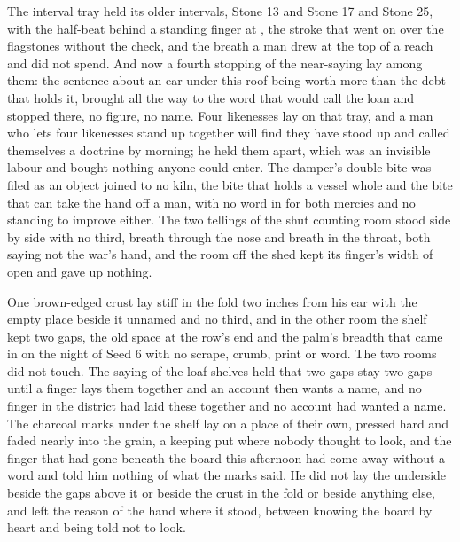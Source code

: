 The interval tray held its older intervals, Stone 13 and Stone 17 and Stone 25, with the half-beat behind a standing finger at , the stroke that went on over the flagstones without the check, and the breath a man drew at the top of a reach and did not spend. And now a fourth stopping of the near-saying lay among them: the sentence about an ear under this roof being worth more than the debt that holds it, brought all the way to the word that would call the loan and stopped there, no figure, no name. Four likenesses lay on that tray, and a man who lets four likenesses stand up together will find they have stood up and called themselves a doctrine by morning; he held them apart, which was an invisible labour and bought nothing anyone could enter. The damper's double bite was filed as an object joined to no kiln, the bite that holds a vessel whole and the bite that can take the hand off a man, with no word in  for both mercies and no standing to improve either. The two tellings of the shut counting room stood side by side with no third, breath through the nose and breath in the throat, both saying not the war's hand, and the room off the shed kept its finger's width of open and gave up nothing.

One brown-edged crust lay stiff in the fold two inches from his ear with the empty place beside it unnamed and no third, and in the other room the shelf kept two gaps, the old space at the row's end and the palm's breadth that came in on the night of Seed 6 with no scrape, crumb, print or word. The two rooms did not touch. The saying of the loaf-shelves held that two gaps stay two gaps until a finger lays them together and an account then wants a name, and no finger in the district had laid these together and no account had wanted a name. The charcoal marks under the shelf lay on a place of their own, pressed hard and faded nearly into the grain, a keeping put where nobody thought to look, and the finger that had gone beneath the board this afternoon had come away without a word and told him nothing of what the marks said. He did not lay the underside beside the gaps above it or beside the crust in the fold or beside anything else, and left the reason of the hand where it stood, between knowing the board by heart and being told not to look.

